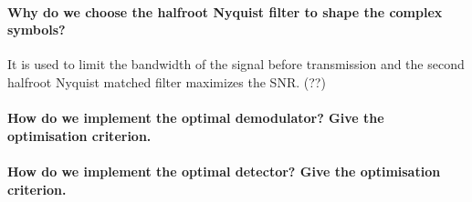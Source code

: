 \paragraph{Why do we choose the halfroot Nyquist filter to shape the complex symbols?}
It is used to limit the bandwidth of the signal before transmission and the second halfroot Nyquist matched filter maximizes the SNR. (??)
\paragraph{How do we implement the optimal demodulator? Give the optimisation criterion.}
\paragraph{How do we implement the optimal detector? Give the optimisation criterion.}